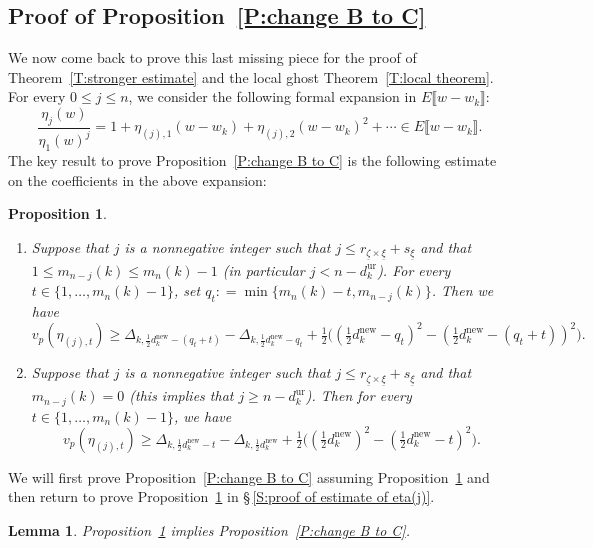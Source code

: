 \documentclass[12pt]{amsart}
\newtheorem{lemma}[subsection]{Lemma}
\newtheorem{proposition}[subsection]{Proposition}
\theoremstyle{definition}
\numberwithin{equation}{subsection}
\newcommand{\new}{\mathrm{new}}
\newcommand{\ur}{\mathrm{ur}}
\begin{document}
\subsection{Proof of Proposition~\ref{P:change B to C}}
\label{S:proof of change B to C}
We now come back to prove this last missing piece for the proof of Theorem~\ref{T:stronger estimate} and the local ghost Theorem~\ref{T:local theorem}.
For every $0\leq j\leq n$, we consider the following formal expansion in $E\llbracket w-w_k\rrbracket$:
$$
\frac{\eta_j(w)}{\eta_1(w)^j} = 1+\eta_{(j),1}(w-w_k) + \eta_{(j),2} (w-w_k)^2 + \cdots \in E\llbracket w-w_k\rrbracket.
$$
The key result to prove Proposition~\ref{P:change B to C} is the following estimate on the coefficients in the above expansion:
\begin{proposition}\label{P:estimate of eta(j)}
\begin{enumerate}
\item Suppose that $j$ is a nonnegative integer such that $j\leq r_{\underline\zeta\times \underline \xi}+s_{\underline \xi}  $ and that $1\leq m_{n-j}(k)\leq m_n(k)-1$ (in particular $j<n-d_k^\ur$).
For every $t\in \{1,\dots, m_n(k)-1 \}$, set $q_t: =\min\{m_n(k)-t, m_{n-j}(k)\}$. Then we have 
		\begin{equation}
			\label{E:vp of eta(j)}
			v_p(\eta_{(j),t}) \geq  \Delta_{k,\frac 12d_k^\new - (q_t +t)}-\Delta_{k,\frac 12d_k^\new - q_t}
			+\tfrac 12\big( (\tfrac 12d_k^\new - q_t)^2-(\tfrac 12d_k^\new -( q_t+t))^2\big).
		\end{equation}
		\item Suppose that $j$ is a nonnegative integer such that $j\leq r_{\underline\zeta\times \underline \xi}+s_{\underline \xi} $ and that $m_{n-j}(k)=0$ (this implies that  $j\geq n-d_k^\ur$).
          Then for every $t\in \{1,\dots, m_n(k)-1 \}$, we have 
			\begin{equation}
			\label{E:vp of eta(j) second version}
			v_p(\eta_{(j),t}) \geq  \Delta_{k,\frac 12d_k^\new - t}-\Delta_{k,\frac 12d_k^\new }
			+\tfrac 12\big( (\tfrac 12d_k^\new )^2-(\tfrac 12d_k^\new -t)^2\big).
		\end{equation}
	\end{enumerate}
\end{proposition}

We will first prove Proposition~\ref{P:change B to C} assuming Proposition~\ref{P:estimate of eta(j)} and then return to prove Proposition~\ref{P:estimate of eta(j)} in \S\,\ref{S:proof of estimate of eta(j)}.

\begin{lemma}
	Proposition~\ref{P:estimate of eta(j)} implies Proposition~\ref{P:change B to C}.
\end{lemma}
\end{document}
